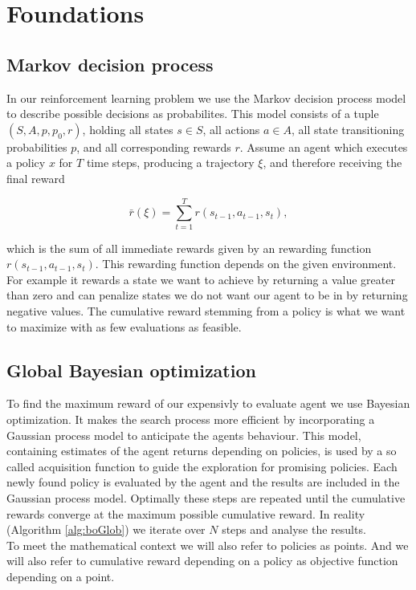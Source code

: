 \chapter{Foundations}
\label{chap:2}

\section{Markov decision process}
In our reinforcement learning problem we use the Markov decision process model to describe possible decisions as probabilites. This model consists of a tuple $(S,A,p,p_{0},r)$, holding all states $s \in S$, all actions $a \in A$, all state transitioning probabilities $p$, and all corresponding rewards $r$. Assume an agent which executes a policy $x$ for $T$ time steps, producing a trajectory $\xi$, and therefore receiving the final reward

$$\bar{r}(\xi)=\sum_{t=1}^T r(s_{t-1}, a_{t-1}, s_{t}),$$

which is the sum of all immediate rewards given by an rewarding function $r(s_{t-1}, a_{t-1}, s_{t})$. This rewarding function depends on the given environment. For example it rewards a state we want to achieve by returning a value greater than zero and can penalize states we do not want our agent to be in by returning negative values. The cumulative reward stemming from a policy is what we want to maximize with as few evaluations as feasible.

\section{Global Bayesian optimization}
To find the maximum reward of our expensivly to evaluate agent we use Bayesian optimization. It makes the search process more efficient by incorporating a Gaussian process model to  anticipate the agents behaviour. This model, containing estimates of the agent returns depending on policies, is used by a so called acquisition function to guide the exploration for promising policies. Each newly found policy is evaluated by the agent and the results are included in the Gaussian process model. Optimally these steps are repeated until the cumulative rewards converge at the maximum possible cumulative reward. In reality (Algorithm \ref{alg:boGlob}) we iterate over $N$ steps and analyse the results.\\
To meet the mathematical context we will also refer to policies as points. And we will also refer to cumulative reward depending on a policy as objective function depending on a point.

